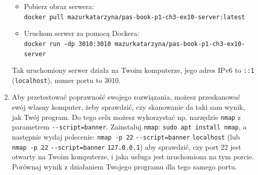\begin{enumerate}[label=\textbf{3.\arabic*}]
\begin{itemize}
\item Pobierz obraz serwera:\\ \texttt{docker pull mazurkatarzyna/pas-book-p1-ch3-ex10-server:latest}

\item Uruchom serwer za pomocą Dockera:\\ \texttt{docker run -dp 3010:3010 mazurkatarzyna/pas-book-p1-ch3-ex10-server}
\end{itemize}

\noindent Tak uruchomiony serwer działa na Twoim komputerze, jego adres IPv6 to \texttt{::1} (\texttt{localhost}), numer portu to 3010.
 \item    Aby przetestować poprawność swojego rozwiązania, możesz przeskanować swój własny komputer, żeby sprawdzić, czy skanowanie da taki sam wynik, jak Twój program. Do tego celu możesz wykorzystać np. narzędzie \texttt{nmap} z parametrem \texttt{-{}-}\texttt{script=banner}. Zainstaluj \texttt{nmap}: \texttt{sudo apt install nmap}, a następnie wydaj polecenie: \texttt{nmap -p 22} \texttt{-{}-}\texttt{script=banner} \texttt{localhost} (lub \texttt{nmap -p 22} \texttt{-{}-}\texttt{script=banner} \texttt{127.0.0.1}) aby sprawdzić, czy port 22 jest otwarty na Twoim komputerze, i jaka usługa jest uruchomiona na tym porcie. Porównaj wynik z działaniem Twojego programu dla tego samego portu.  


\end{enumerate}
